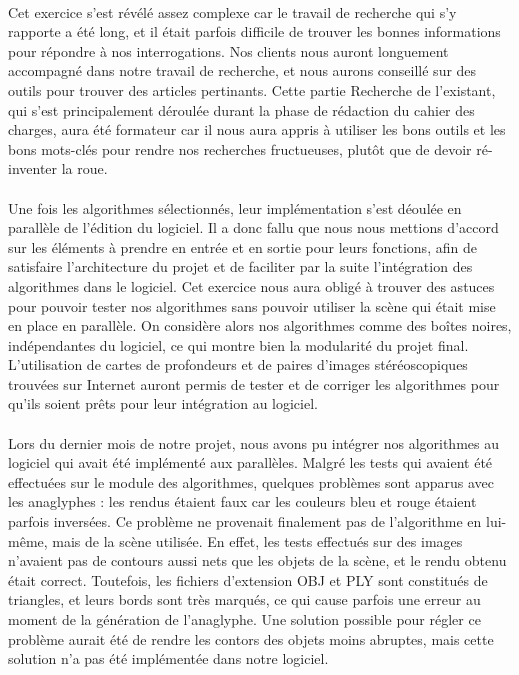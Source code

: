 \paragraph{}
Cet exercice s'est révélé assez complexe car le travail de recherche qui s'y rapporte a été long, et il était parfois difficile de trouver les bonnes informations pour répondre à nos interrogations. Nos clients nous auront longuement accompagné dans notre travail de recherche, et nous aurons conseillé sur des outils pour trouver des articles pertinants. Cette partie Recherche de l'existant, qui s'est principalement déroulée durant la phase de rédaction du cahier des charges, aura été formateur car il nous aura appris à utiliser les bons outils et les bons mots-clés pour rendre nos recherches fructueuses, plutôt que de devoir ré-inventer la roue.

\paragraph{}
Une fois les algorithmes sélectionnés, leur implémentation s'est déoulée en parallèle de l'édition du logiciel. Il a donc fallu que nous nous mettions d'accord sur les éléments à prendre en entrée et en sortie pour leurs fonctions, afin de satisfaire l'architecture du projet et de faciliter par la suite l'intégration des algorithmes dans le logiciel.
Cet exercice nous aura obligé à trouver des astuces pour pouvoir tester nos algorithmes sans pouvoir utiliser la scène qui était mise en place en parallèle. On considère alors nos algorithmes comme des boîtes noires, indépendantes du logiciel, ce qui montre bien la modularité du projet final.
L'utilisation de cartes de profondeurs et de paires d'images stéréoscopiques trouvées sur Internet auront permis de tester et de corriger les algorithmes pour qu'ils soient prêts pour leur intégration au logiciel.

\paragraph{}
Lors du dernier mois de notre projet, nous avons pu intégrer nos algorithmes au logiciel qui avait été implémenté aux parallèles. Malgré les tests qui avaient été effectuées sur le module des algorithmes, quelques problèmes sont apparus avec les anaglyphes : les rendus étaient faux car les couleurs bleu et rouge étaient parfois inversées.
Ce problème ne provenait finalement pas de l'algorithme en lui-même, mais de la scène utilisée. En effet, les tests effectués sur des images n'avaient pas de contours aussi nets que les objets de la scène, et le rendu obtenu était correct. Toutefois, les fichiers d'extension OBJ et PLY sont constitués de triangles, et leurs bords sont très marqués, ce qui cause parfois une erreur au moment de la génération de l'anaglyphe. Une solution possible pour régler ce problème aurait été de rendre les contors des objets moins abruptes, mais cette solution n'a pas été implémentée dans notre logiciel.

